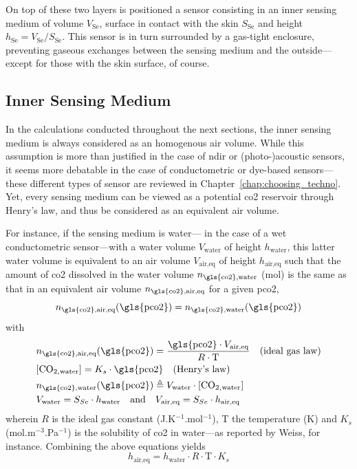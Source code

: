 On top of these two layers is positioned a sensor consisting in an inner sensing medium of volume $V_\text{Se}$, surface in contact with the skin $S_\text{Se}$ and height $h_\text{Se} = V_\text{Se} / S_\text{Se}$. This sensor is in turn surrounded by a gas-tight enclosure, preventing gaseous exchanges between the sensing medium and the outside---except for those with the skin surface, of course.

\subsection{Inner Sensing Medium}\label{sect:tcco2:inner_medium}

In the calculations conducted throughout the next sections, the inner sensing medium is always considered as an homogenous air volume. While this assumption is more than justified in the case of \gls{ndir} or (photo-)acoustic sensors, it seems more debatable in the case of conductometric or dye-based sensors---these different types of sensor are reviewed in Chapter~\ref{chap:choosing_techno}. Yet, every sensing medium can be viewed as a potential \gls{co2} reservoir through Henry's law, and thus be considered as an equivalent air volume.

For instance, if the sensing medium is water---\eg{} in the case of a wet conductometric sensor---with a water volume $V_\text{water}$ of height $h_\text{water}$, this latter water volume is equivalent to an air volume $V_\text{air,eq}$ of height $h_\text{air,eq}$ such that the amount of \gls{co2} dissolved in the water volume $n_\text{\gls{co2},water}$ (mol) is the same as that in an equivalent air volume $n_\text{\gls{co2},air,eq}$ for a given \gls{pco2}, \ie{}
\begin{equation}
	n_\text{\gls{co2},air,eq}(\text{\gls{pco2}}) = n_\text{\gls{co2},water}(\text{\gls{pco2}})
\end{equation}
with
\begin{equation}
	\begin{aligned}
		&n_\text{\gls{co2},air,eq}(\text{\gls{pco2}}) = \frac{\text{\gls{pco2}} \cdot V_\text{air,eq}}{R\cdot \text{T}} \quad \text{(ideal gas law)}\\
		&\ce{[CO_{2,water}]} = K_s \cdot \text{\gls{pco2}} \quad \text{(Henry's law)}\\
		&n_\text{\gls{co2},water}(\text{\gls{pco2}}) \triangleq V_\text{water} \cdot \ce{[CO_{2,water}]}\\
		&V_\text{water} = S_{Se} \cdot h_\text{water} \quad \text{and} \quad V_\text{air,eq} = S_{Se} \cdot h_\text{air,eq}\\
	\end{aligned}
\end{equation}
wherein $R$ is the ideal gas constant (J.K$^{-1}$.mol$^{-1}$), T the temperature (K) and $K_s$ (mol.m$^{-3}$.Pa$^{-1}$) is the solubility of \gls{co2} in water---as reported by Weiss\cite{weiss1974}, for instance. Combining the above equations yields
\begin{equation}
	h_\text{air,eq} = h_\text{water} \cdot R \cdot \text{T} \cdot K_s
\end{equation}

